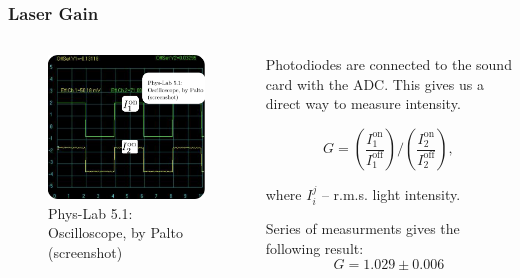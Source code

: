 \documentclass{beamer}
\begin{document}
\begin{frame}
	\frametitle{Laser Gain}
	
	
	\begin{columns}
		\begin{column}{0.4\textwidth}
			\begin{figure}
				\centering
				\includegraphics[width=1\linewidth]{res/oscilloscope.png}
				\caption{Phys-Lab 5.1: Oscilloscope, by Palto (screenshot)}
			\end{figure}
		\end{column}
		\begin{column}{0.6\textwidth}
			Photodiodes are connected to the sound card with the ADC. This gives us a direct way to measure intensity. 
			
			$$G = \left(\frac{I^{\text{on}}_{1}}{I^{\text{off}}_{1}}\right)/\left(\frac{I^{\text{on}}_{2}}{I^{\text{off}}_{2}}\right),$$
			
			where $I_i^j$ -- r.m.s. light intensity.
			
			Series of measurments gives the following result:
			$$G = 1.029 \pm 0.006$$
		\end{column}
	\end{columns}
	
\end{frame}
\end{document}
